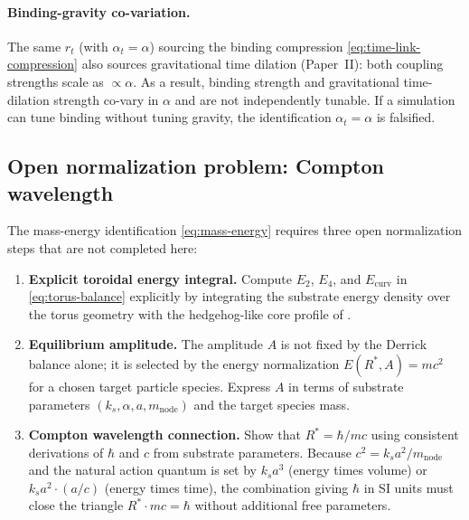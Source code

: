 \paragraph{Binding-gravity co-variation.}
The same $r_t$ (with $\alpha_t=\alpha$) sourcing the binding compression \eqref{eq:time-link-compression}
also sources gravitational time dilation (Paper~II): both coupling strengths scale as $\propto\alpha$.
As a result, binding strength and gravitational time-dilation strength co-vary in $\alpha$ and are not
independently tunable.
If a simulation can tune binding without tuning gravity, the identification $\alpha_t=\alpha$ is
falsified.

\subsection{Open normalization problem: Compton wavelength}
\label{subsec:mass-normalization}

The mass-energy identification \eqref{eq:mass-energy} requires three open normalization steps that
are not completed here:

\begin{enumerate}
  \item \textbf{Explicit toroidal energy integral.}
  Compute $E_2$, $E_4$, and $E_{\mathrm{curv}}$ in \eqref{eq:torus-balance} explicitly by
  integrating the substrate energy density over the torus geometry with the hedgehog-like core
  profile of .

  \item \textbf{Equilibrium amplitude.}
  The amplitude $A$ is not fixed by the Derrick balance alone; it is selected by the energy
  normalization $E(R^*,A)=mc^2$ for a chosen target particle species.
  Express $A$ in terms of substrate parameters $(k_s,\alpha,a,m_{\mathrm{node}})$ and the
  target species mass.

  \item \textbf{Compton wavelength connection.}
  Show that $R^*=\hbar/mc$ using consistent derivations of $\hbar$ and $c$ from substrate
  parameters.
  Because $c^2=k_s a^2/m_{\mathrm{node}}$ and the natural action quantum is set by
  $k_s a^3$ (energy times volume) or $k_s a^2\cdot(a/c)$ (energy times time), the
  combination giving $\hbar$ in SI units must close the triangle
  $R^*\cdot mc = \hbar$ without additional free parameters.
\end{enumerate}

